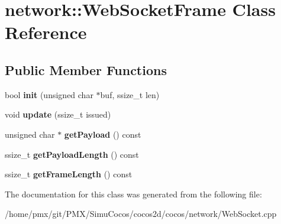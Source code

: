 \hypertarget{classnetwork_1_1WebSocketFrame}{}\section{network\+:\+:Web\+Socket\+Frame Class Reference}
\label{classnetwork_1_1WebSocketFrame}
\subsection*{Public Member Functions}
\begin{DoxyCompactItemize}
\item 
\mbox{\label{classnetwork_1_1WebSocketFrame_aa3599b3bd4103897d656b23dc84031eb}} 
bool {\bfseries init} (unsigned char $\ast$buf, ssize\+\_\+t len)
\item 
\mbox{\label{classnetwork_1_1WebSocketFrame_ad2d48e5ebc414cb2b8e0de89590f69bc}} 
void {\bfseries update} (ssize\+\_\+t issued)
\item 
\mbox{\label{classnetwork_1_1WebSocketFrame_a7a21912676fff4b2c6ea2d051cd4fab8}} 
unsigned char $\ast$ {\bfseries get\+Payload} () const
\item 
\mbox{\label{classnetwork_1_1WebSocketFrame_a14451668b639ea0b03f60d19d4e5263d}} 
ssize\+\_\+t {\bfseries get\+Payload\+Length} () const
\item 
\mbox{\label{classnetwork_1_1WebSocketFrame_a8adc56d84ccbfbf0822d0d125aaa3c36}} 
ssize\+\_\+t {\bfseries get\+Frame\+Length} () const
\end{DoxyCompactItemize}


The documentation for this class was generated from the following file\+:\begin{DoxyCompactItemize}
\item 
/home/pmx/git/\+P\+M\+X/\+Simu\+Cocos/cocos2d/cocos/network/Web\+Socket.\+cpp\end{DoxyCompactItemize}
